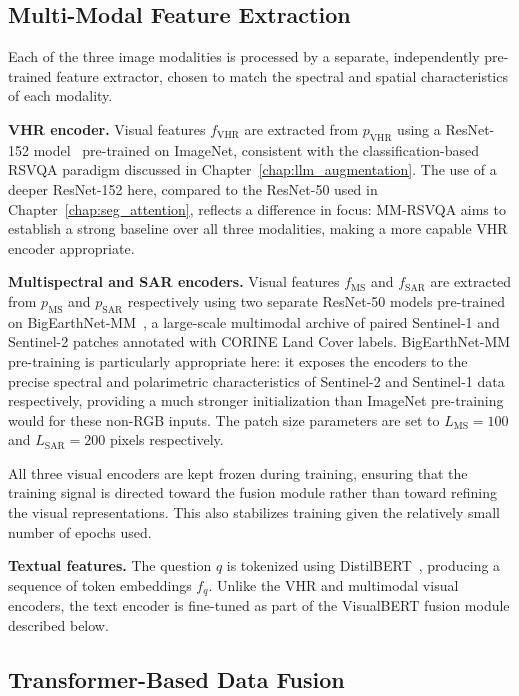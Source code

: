 \subsection{Multi-Modal Feature Extraction}
\label{sec:chap5_method_features}

Each of the three image modalities is processed by a
separate, independently pre-trained feature extractor,
chosen to match the spectral and spatial characteristics
of each modality.

\textbf{VHR encoder.} Visual features $f_\text{VHR}$ are
extracted from $p_\text{VHR}$ using a ResNet-152
model~\cite{he2016resnet} pre-trained on ImageNet,
consistent with the classification-based RSVQA paradigm discussed
in Chapter~\ref{chap:llm_augmentation}. The use of a
deeper ResNet-152 here, compared to the ResNet-50 used in
Chapter~\ref{chap:seg_attention}, reflects a difference in
focus: MM-RSVQA aims to establish a
strong baseline over all three modalities, making a more
capable VHR encoder appropriate.

\textbf{Multispectral and SAR encoders.} Visual features
$f_\text{MS}$ and $f_\text{SAR}$ are extracted from
$p_\text{MS}$ and $p_\text{SAR}$ respectively using two
separate ResNet-50 models pre-trained on
BigEarthNet-MM~\cite{sumbul2021bigearthnetmm}, a
large-scale multimodal archive of paired Sentinel-1 and
Sentinel-2 patches annotated with CORINE Land Cover labels.
BigEarthNet-MM pre-training is particularly appropriate
here: it exposes the encoders to the precise spectral and
polarimetric characteristics of Sentinel-2 and Sentinel-1
data respectively, providing a much stronger initialization
than ImageNet pre-training would for these non-RGB inputs.
The patch size parameters are set to $L_\text{MS} = 100$
and $L_\text{SAR} = 200$ pixels respectively.

All three visual encoders are kept frozen during training,
ensuring that the training signal is directed toward the
fusion module rather than toward refining the visual
representations. This also stabilizes training given the
relatively small number of epochs used.

\textbf{Textual features.} The question $q$ is tokenized
using DistilBERT~\cite{sanh2019distilbert}, producing a
sequence of token embeddings $f_q$. Unlike the VHR and
multimodal visual encoders, the text encoder is fine-tuned
as part of the VisualBERT fusion module described below.

\subsection{Transformer-Based Data Fusion}
\label{sec:chap5_method_fusion}

